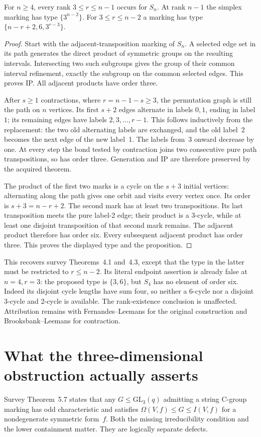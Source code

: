 \documentclass[11pt,a4paper]{article}
\begin{document}
\begin{proposition}\label{sym}
For $n\ge4$, every rank $3\le r\le n-1$ occurs for $S_n$. At rank $n-1$
the simplex marking has type $\{3^{n-2}\}$. For $3\le r\le n-2$ a marking
has type $\{n-r+2,6,3^{r-3}\}$.
\end{proposition}
\begin{proof}
Start with the adjacent-transposition marking of $S_n$. A selected edge set
in its path generates the direct product of symmetric groups on the resulting
intervals. Intersecting two such subgroups gives the group of their common
interval refinement, exactly the subgroup on the common selected edges.
This proves IP. All adjacent products have order three.

After $s\ge1$ contractions, where $r=n-1-s\ge3$, the permutation graph is
still the path on $n$ vertices. Its first $s+2$ edges alternate in labels
$0,1$, ending in label $1$; its remaining edges have labels
$2,3,\ldots,r-1$. This follows inductively from the replacement: the two
old alternating labels are exchanged, and the old label~2 becomes the next
edge of the new label~1. The labels from~3 onward decrease by one.
At every step the bond tested by contraction joins two consecutive pure
path transpositions, so has order three. Generation and IP are therefore
preserved by the acquired theorem.

The product of the first two marks is a cycle on the $s+3$ initial vertices:
alternating along the path gives one orbit and visits every vertex once.
Its order is $s+3=n-r+2$. The second mark has at least two transpositions.
Its last transposition meets the pure label-2 edge; their product is a
3-cycle, while at least one disjoint transposition of that second mark
remains. The adjacent product therefore has order six. Every subsequent
adjacent product has order three. This proves the displayed type and the
proposition.
\end{proof}
This recovers survey Theorems~4.1 and~4.3, except that the type in the latter
must be restricted to $r\le n-2$. Its literal endpoint assertion is already
false at $n=4,r=3$: the proposed type is $\{3,6\}$, but $S_4$ has no element
of order six. Indeed its disjoint cycle lengths have sum four, so neither a
6-cycle nor a disjoint 3-cycle and 2-cycle is available. The rank-existence
conclusion is unaffected. Attribution remains with Fernandes--Leemans for
the original construction and Brooksbank--Leemans for contraction.

\section{What the three-dimensional obstruction actually asserts}
Survey Theorem~5.7 states that any $G\le\mathrm{GL}_3(q)$ admitting a string
C-group marking has odd characteristic and satisfies
$\Omega(V,f)\le G\le I(V,f)$ for a nondegenerate symmetric form~$f$.
Both the missing irreducibility condition and the lower containment matter.
They are logically separate defects.
\end{document}
